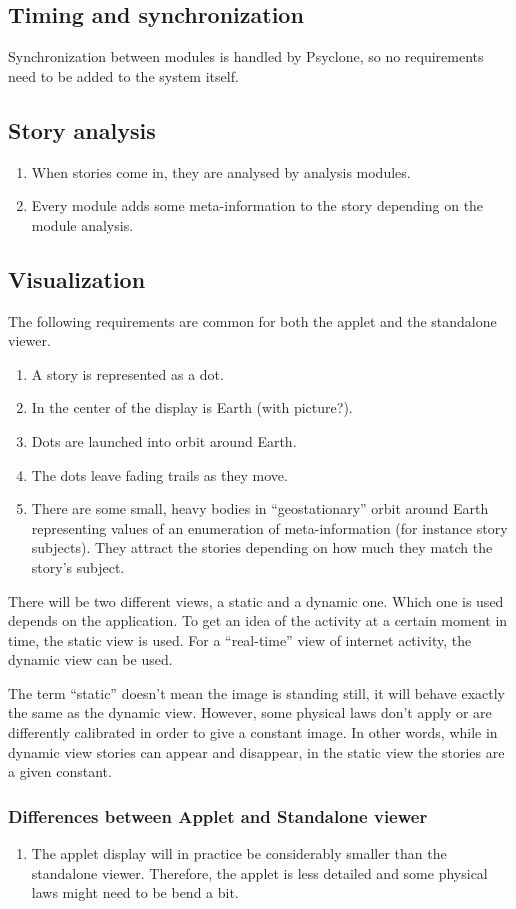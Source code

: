 \subsection{Timing and synchronization}

Synchronization between modules is handled by Psyclone, so no requirements need
to be added to the system itself.

\subsection{Story analysis}

\begin{enumerate}
  \item When stories come in, they are analysed by analysis modules.
  \item Every module adds some meta-information to the story depending on the
    module analysis.
\end{enumerate}

\subsection{Visualization}

The following requirements are common for both the applet and the standalone
viewer.

\begin{enumerate}
  \item A story is represented as a dot.
  \item In the center of the display is Earth (with picture?).
  \item Dots are launched into orbit around Earth.
  \item The dots leave fading trails as they move.
  \item There are some small, heavy bodies in ``geostationary'' orbit around
    Earth representing values of an enumeration of meta-information (for
    instance story subjects). They attract the stories depending on how much
    they match the story's subject. 
\end{enumerate}

There will be two different views, a static and a dynamic one. Which one is
used depends on the application. To get an idea of the activity at a certain
moment in time, the static view is used. For a ``real-time'' view of internet
activity, the dynamic view can be used.

The term ``static'' doesn't mean the image is standing still, it will behave
exactly the same as the dynamic view. However, some physical laws don't apply
or are differently calibrated in order to give a constant image. In other
words, while in dynamic view stories can appear and disappear, in the static
view the stories are a given constant.

\subsubsection{Differences between Applet and Standalone viewer}

\begin{enumerate}
  \item The applet display will in practice be considerably smaller than the
    standalone viewer. Therefore, the applet is less detailed and some physical
    laws might need to be bend a bit.
\end{enumerate}

